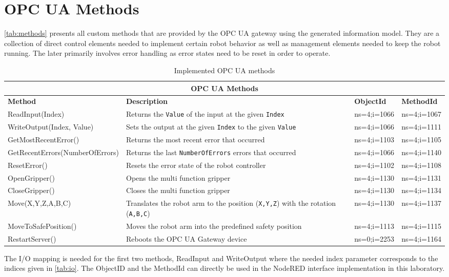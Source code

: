 \documentclass{article}
\begin{document}
\section{OPC UA Methods}
\autoref{tab:methods} presents all custom methods that are provided by the OPC UA gateway using the generated information model. They are a collection of direct control elements needed to implement certain robot behavior as well as management elements needed to keep the robot running. The later primarily involves error handling as error states need to be reset in order to operate.
\begin{table}[H]
	\setlength\extrarowheight{4pt}
	\small
	\begin{tabularx}{\textwidth}{|p{5cm}|p{4.5cm}|X|X|}
		\hline
		\multicolumn{4}{|c|}{\bf \color{black} \large OPC UA Methods}\\
		\hline\hline
		\bf Method &\bf Description & \bf ObjectId & \bf MethodId\\
		\hline\hline
		ReadInput(Index) & Returns the \texttt{Value} of the input at the given \texttt{Index}& ns=4;i=1066& ns=4;i=1067\\
		\hline
		WriteOutput(Index, Value) & Sets the output at the given \texttt{Index} to the given \texttt{Value}& ns=4;i=1066 & ns=4;i=1111\\
		\hline
		GetMostRecentError() & Returns the most recent error that occurred & ns=4;i=1103 & ns=4;i=1105\\
		\hline
		GetRecentErrors(NumberOfErrors) & Returns the last \texttt{NumberOfErrors} errors that occurred& ns=4;i=1066 & ns=4;i=1140\\
		\hline
		ResetError() & Resets the error state of the robot controller& ns=4;i=1102 & ns=4;i=1108\\
		\hline
		OpenGripper() & Opens the multi function gripper& ns=4;i=1130 & ns=4;i=1131\\
		\hline
		CloseGripper() & Closes the multi function gripper& ns=4;i=1130& ns=4;i=1134\\
		\hline
		Move(X,Y,Z,A,B,C) & Translates the robot arm to the position (\texttt{X,Y,Z}) with the rotation (\texttt{A,B,C})& ns=4;i=1130 & ns=4;i=1137\\
		\hline
		MoveToSafePosition() & Moves the robot arm into the predefined safety position & ns=4;i=1113&ns=4;i=1115\\
		\hline
		RestartServer() & Reboots the OPC UA Gateway device & ns=0;i=2253& ns=4;i=1164\\
		\hline
	\end{tabularx}
	\caption{Implemented OPC UA methods}
	\label{tab:methods}
\end{table}
The I/O mapping is needed for the first two methods, ReadInput and WriteOutput where the needed index parameter corresponds to the indices given in \autoref{tab:io}.\newline
The ObjectID and the MethodId can directly be used in the NodeRED interface implementation in this laboratory.
\newpage
\end{document}
